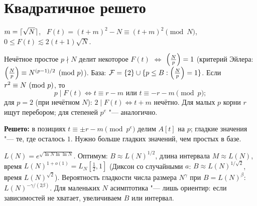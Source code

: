 \documentclass{ca-handout}
\begin{document}
\section{Квадратичное решето}
$m = \lceil\sqrt N\rceil$, \ $F(t) = (t + m)^2 - N \equiv (t + m)^2 \pmod N$, \
$0 \le F(t) \lesssim 2(t + 1)\sqrt N$.
\begin{reminder}[title={Факторная база и позиции просеивания}]
Нечётное простое $p \nmid N$ делит некоторое $F(t)$ $\iff$ $\left(\frac{N}{p}\right) = 1$
(критерий Эйлера: $\left(\frac{N}{p}\right) \equiv N^{(p-1)/2} \pmod p$). База:
$\mathcal F = \{2\} \cup \{p \le B : \left(\frac{N}{p}\right) = 1\}$. Если $r^2 \equiv N\ (\mathrm{mod}\ p)$, то
\[
  p \mid F(t) \iff t \equiv r - m \text{ или } t \equiv -r - m \pmod p;
\]
для $p = 2$ (при нечётном $N$): $2 \mid F(t) \iff t + m$ нечётно. Для малых $p$ корни $r$
ищут перебором; для степеней $p^e$ "--- аналогично.
\end{reminder}
\textbf{Решето:} в позициях $t \equiv \pm r - m \pmod{p^e}$ делим $A[t]$ на $p$; гладкие
значения "--- те, где осталось $1$. Нужно больше гладких значений, чем простых в базе.

\begin{reminder}[title={Выбор параметров (эвристика)}]
$L(N) = e^{\sqrt{\ln N \ln\ln N}}$. Оптимум: $B \approx L(N)^{1/2}$, длина интервала
$M \approx L(N)$, время $L(N)^{1 + o(1)} = L_N[\frac12, 1]$ (Диксон со случайными $a$:
$B \approx L(N)^{1/\sqrt2}$, время $L(N)^{\sqrt 2}$). Вероятность гладкости числа размера
$N^{\gamma}$ при $B = L(N)^{\beta}$: $L(N)^{-\gamma/(2\beta)}$. Для маленьких $N$ асимптотика
"--- лишь ориентир: если зависимостей не хватает, увеличиваем $B$ или интервал.
\end{reminder}
\end{document}
